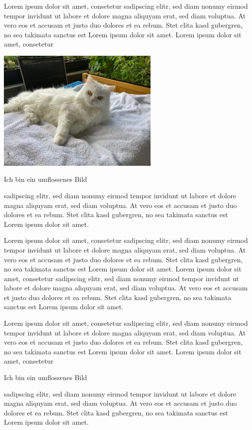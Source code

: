 \documentclass[12pt,ngerman,parskip=half]{scrartcl}
\begin{document}
\listoffigures

\vspace*{3cm}


Lorem ipsum dolor sit amet, consetetur sadipscing elitr, sed diam
nonumy eirmod tempor invidunt ut labore et dolore magna aliquyam erat, sed diam voluptua. At vero eos et accusam et justo duo dolores et ea rebum. Stet clita kasd gubergren, no sea takimata sanctus est Lorem ipsum dolor sit amet. Lorem ipsum dolor sit amet, consetetur
\begin{floatingfigure}{0.6\textwidth}%
  \includegraphics[width=0.6\textwidth]{Bilder/Katze1}
  \caption{Ich bin ein umflossenes Bild}
\end{floatingfigure}%
 sadipscing elitr, sed diam nonumy eirmod tempor invidunt ut labore et dolore magna aliquyam erat, sed diam voluptua. At vero eos et accusam et justo duo dolores et ea rebum. Stet clita kasd gubergren, no sea takimata sanctus est Lorem ipsum dolor sit amet.

Lorem ipsum dolor sit amet, consetetur sadipscing elitr, sed diam nonumy eirmod tempor invidunt ut labore et dolore magna aliquyam erat, sed diam voluptua. At vero eos et accusam et justo duo dolores et ea rebum. Stet clita kasd gubergren, no sea takimata sanctus est Lorem ipsum dolor sit amet. Lorem ipsum dolor sit amet, consetetur sadipscing elitr, sed diam nonumy eirmod tempor invidunt ut labore et dolore magna aliquyam erat, sed diam voluptua. At vero eos et accusam et justo duo dolores et ea rebum. Stet clita kasd gubergren, no sea takimata sanctus est Lorem ipsum dolor sit amet.

Lorem ipsum dolor sit amet, consetetur sadipscing elitr, sed diam
nonumy eirmod tempor invidunt ut labore et dolore magna aliquyam erat, sed diam voluptua. At vero eos et accusam et justo duo dolores et ea rebum. Stet clita kasd gubergren, no sea takimata sanctus est Lorem ipsum dolor sit amet. Lorem ipsum dolor sit amet, consetetur
\begin{floatingfigure}{0.5\textwidth}%
  \caption{Ich bin ein umflossenes Bild}
\end{floatingfigure}%
 sadipscing elitr, sed diam nonumy eirmod tempor invidunt ut labore et dolore magna aliquyam erat, sed diam voluptua. At vero eos et accusam et justo duo dolores et ea rebum. Stet clita kasd gubergren, no sea takimata sanctus est Lorem ipsum dolor sit amet.
\end{document}
